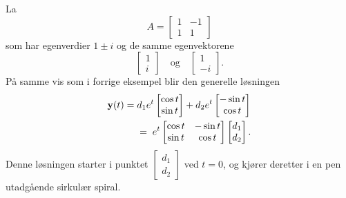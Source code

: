 \begin{ex}
La 
\[
A=
\begin{bmatrix}
1 & -1   \\
1 & 1
\end{bmatrix}
\]
som har egenverdier $1\pm i$ og de samme egenvektorene
\[
\begin{bmatrix}
1  \\
i 
\end{bmatrix}
\quad \text{og} \quad
\begin{bmatrix}
1  \\
-i 
\end{bmatrix}. 
\]
På samme vis som i forrige eksempel blir den generelle løsningen 
\begin{align*}
\mathbf{y}(t)=\;&d_1e^t\begin{bmatrix} \cos t \\ \sin t\end{bmatrix}+d_2e^t\begin{bmatrix}  -\sin t \\ \cos t\end{bmatrix}\\&=\;e^t\begin{bmatrix} \cos t & -\sin t\\ \sin t & \cos t\end{bmatrix}\begin{bmatrix} d_1 \\ d_2 \end{bmatrix}.
\end{align*}
Denne løsningen starter i punktet $\begin{bmatrix} d_1 \\ d_2 \end{bmatrix}$ ved $t=0$, og kjører deretter i en pen utadgående sirkulær spiral.
\end{ex}

